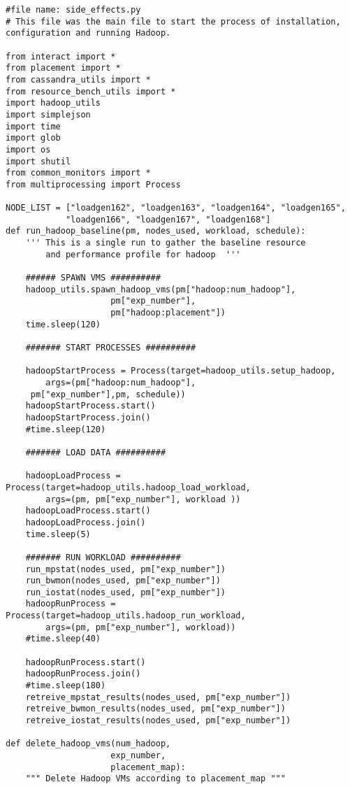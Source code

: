 \begin{verbatim}
#file name: side_effects.py
# This file was the main file to start the process of installation, configuration and running Hadoop.

from interact import *
from placement import *
from cassandra_utils import *
from resource_bench_utils import *
import hadoop_utils
import simplejson
import time
import glob
import os
import shutil
from common_monitors import *
from multiprocessing import Process

NODE_LIST = ["loadgen162", "loadgen163", "loadgen164", "loadgen165", 
            "loadgen166", "loadgen167", "loadgen168"]
def run_hadoop_baseline(pm, nodes_used, workload, schedule):
    ''' This is a single run to gather the baseline resource
        and performance profile for hadoop  '''

    ###### SPAWN VMS ##########
    hadoop_utils.spawn_hadoop_vms(pm["hadoop:num_hadoop"],
                     pm["exp_number"],
                     pm["hadoop:placement"])
    time.sleep(120)

    ####### START PROCESSES ##########

    hadoopStartProcess = Process(target=hadoop_utils.setup_hadoop, 
        args=(pm["hadoop:num_hadoop"],
     pm["exp_number"],pm, schedule))
    hadoopStartProcess.start()
    hadoopStartProcess.join()
    #time.sleep(120)

    ####### LOAD DATA ##########

    hadoopLoadProcess = Process(target=hadoop_utils.hadoop_load_workload, 
        args=(pm, pm["exp_number"], workload ))
    hadoopLoadProcess.start()
    hadoopLoadProcess.join()
    time.sleep(5)

    ####### RUN WORKLOAD ##########
    run_mpstat(nodes_used, pm["exp_number"])
    run_bwmon(nodes_used, pm["exp_number"])
    run_iostat(nodes_used, pm["exp_number"])
    hadoopRunProcess = Process(target=hadoop_utils.hadoop_run_workload, 
        args=(pm, pm["exp_number"], workload))
    #time.sleep(40)

    hadoopRunProcess.start()
    hadoopRunProcess.join()
    #time.sleep(180)
    retreive_mpstat_results(nodes_used, pm["exp_number"])
    retreive_bwmon_results(nodes_used, pm["exp_number"])
    retreive_iostat_results(nodes_used, pm["exp_number"])

def delete_hadoop_vms(num_hadoop,
                     exp_number,
                     placement_map):
    """ Delete Hadoop VMs according to placement_map """


\end{verbatim}
